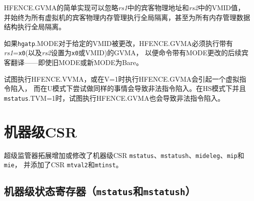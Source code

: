 \begin{commentary}
  HFENCE.GVMA的简单实现可以忽略{\em rs1}中的宾客物理地址和{\em rs2}中的VMID值，
  并始终为所有虚拟机的宾客物理内存管理执行全局隔离，甚至为所有内存管理数据结构执行全局隔离。
\end{commentary}

如果{\tt hgatp}.MODE对于给定的VMID被更改，HFENCE.GVMA必须执行带有{\em rs1}={\tt x0}(以及{\em rs2}设置为{\tt x0}或VMID)的GVMA，
以便命令带有MODE更改的后续宾客翻译——即使旧MODE或新MODE为Bare。

试图执行HFENCE.VVMA，或在V=1时执行HFENCE.GVMA会引起一个虚拟指令陷入，
而在U模式下尝试做同样的事情会导致非法指令陷入。在HS模式下并且{\tt mstatus}.TVM=1时，试图执行HFENCE.GVMA也会导致非法指令陷入。

\section{机器级CSR}

超级监管器拓展增加或修改了机器级CSR {\tt mstatus}、{\tt mstatush}、{\tt mideleg}、{\tt mip}和{\tt mie}，
并添加了CSR {\tt mtval2}和{\tt mtinst}。

\subsection{机器级状态寄存器（{\tt mstatus}和{\tt mstatush}）}

